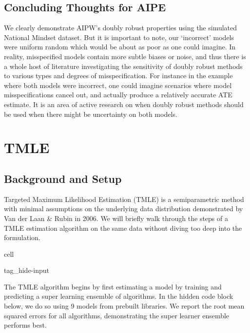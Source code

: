 \documentclass[letterpaper,10pt,english]{jupyterBook}
\begin{document}
\subsection{Concluding Thoughts for AIPE}
\label{\detokenize{DR_Methods:concluding-thoughts-for-aipe}}
\sphinxAtStartPar
We clearly demonstrate AIPW’s doubly robust properties using the simulated National Mindset dataset. But it is important to note, our ‘incorrect’ models were uniform random which would be about as poor as one could imagine. In reality, misspecified models contain more subtle biases or noise, and thus there is a whole host of literature investigating the sensitivity of doubly robust methods to various types and degrees of misspecification. For instance in the example where both models were incorrect, one could imagine scenarios where model misspecifications cancel out, and actually produce a relatively accurate ATE estimate. It is an area of active research on when doubly robust methods should be used when there might be uncertainty on both models.


\section{TMLE}
\label{\detokenize{DR_Methods:tmle}}

\subsection{Background and Setup}
\label{\detokenize{DR_Methods:background-and-setup}}
\sphinxAtStartPar
Targeted Maximum Likelihood Estimation (TMLE) is a semi\sphinxhyphen{}parametric method with minimal assumptions on the underlying data distribution demonstrated by Van der Laan \& Rubin in 2006. We will briefly walk through the steps of a TMLE estimation algorithm on the same data without diving too deep into the formulation.

\begin{sphinxuseclass}{cell}
\begin{sphinxuseclass}{tag_hide-input}
\end{sphinxuseclass}
\end{sphinxuseclass}
\sphinxAtStartPar
The TMLE algorithm begins by first estimating a model by training and predicting a super learning ensemble of algorithms. In the hidden code block below, we do so using 9 models from pre\sphinxhyphen{}built libraries. We report the root mean squared errors for all algorithms, demonstrating the super learner ensemble performs best.
\end{document}
